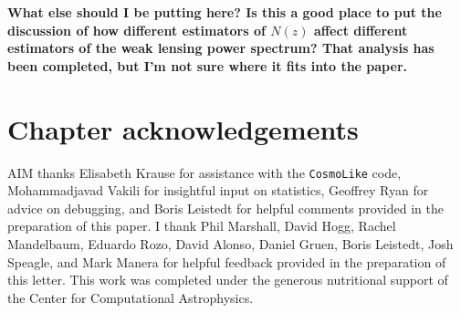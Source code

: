 \textbf{What else should I be putting here?  Is this a good place to put the discussion of how different estimators of $N(z)$ affect different estimators of the weak lensing power spectrum?  That analysis has been completed, but I'm not sure where it fits into the paper.}

\section{Chapter acknowledgements}

AIM thanks Elisabeth Krause for assistance with the \texttt{CosmoLike} code, Mohammadjavad Vakili for insightful input on statistics, Geoffrey Ryan for advice on debugging, and Boris Leistedt for helpful comments provided in the preparation of this paper.
I thank Phil Marshall, David Hogg, Rachel Mandelbaum, Eduardo Rozo, David Alonso, Daniel Gruen, Boris Leistedt, Josh Speagle, and Mark Manera for helpful feedback provided in the preparation of this letter.
This work was completed under the generous nutritional support of the Center for Computational Astrophysics.
